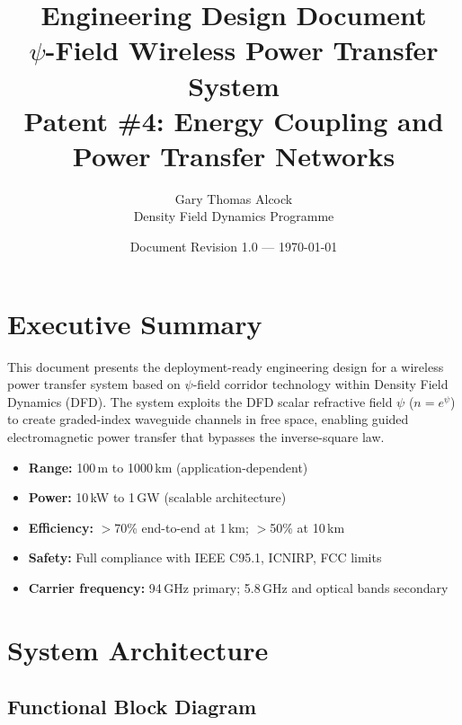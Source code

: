 \documentclass[11pt,a4paper]{article}
\title{\textbf{Engineering Design Document}\\[0.5em]
\Large $\psi$-Field Wireless Power Transfer System\\[0.3em]
\large Patent \#4: Energy Coupling and Power Transfer Networks}
\author{Gary Thomas Alcock\\
Density Field Dynamics Programme}
\date{Document Revision 1.0 --- \today}
\begin{document}
\maketitle
\tableofcontents
\newpage

\section{Executive Summary}

This document presents the deployment-ready engineering design for a
wireless power transfer system based on $\psi$-field corridor technology
within Density Field Dynamics (DFD). The system exploits the DFD scalar
refractive field $\psi$ ($n = e^\psi$) to create graded-index waveguide
channels in free space, enabling guided electromagnetic power transfer
that bypasses the inverse-square law.

\begin{tcolorbox}[colback=blue!5!white, colframe=blue!60!black, title=Key Performance Targets]
\begin{itemize}[nosep]
\item \textbf{Range:} 100\,m to 1000\,km (application-dependent)
\item \textbf{Power:} 10\,kW to 1\,GW (scalable architecture)
\item \textbf{Efficiency:} $>$70\% end-to-end at 1\,km; $>$50\% at 10\,km
\item \textbf{Safety:} Full compliance with IEEE C95.1, ICNIRP, FCC limits
\item \textbf{Carrier frequency:} 94\,GHz primary; 5.8\,GHz and optical bands secondary
\end{itemize}
\end{tcolorbox}

\section{System Architecture}

\subsection{Functional Block Diagram}
\end{document}
